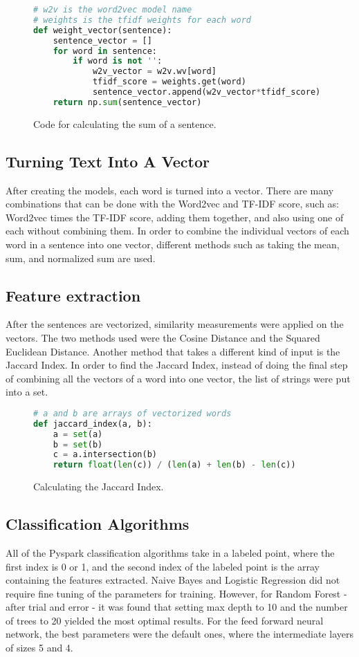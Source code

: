 \documentclass[9pt,twocolumn,twoside]{idsi}
\begin{document}
\begin{figure}[h!]
\begin{lstlisting}[language=python]
# w2v is the word2vec model name
# weights is the tfidf weights for each word
def weight_vector(sentence):
    sentence_vector = []
    for word in sentence:
        if word is not '':
            w2v_vector = w2v.wv[word]
            tfidf_score = weights.get(word)
            sentence_vector.append(w2v_vector*tfidf_score)
    return np.sum(sentence_vector)
\end{lstlisting}
\caption{Code for calculating the sum of a sentence.}
\end{figure}

\subsection{Turning Text Into A Vector}
After creating the models, each word is turned into a vector. There are many combinations that can be done with the Word2vec and TF-IDF score, such as: Word2vec times the TF-IDF score, adding them together, and also using one of each without combining them. In order to combine the individual vectors of each word in a sentence into one vector, different methods such as taking the mean, sum, and normalized sum are used.

\subsection{Feature extraction}
After the sentences are vectorized, similarity measurements were applied on the vectors.
The two methods used were the Cosine Distance and the Squared Euclidean Distance. Another method that takes a different kind of input is the Jaccard Index. 
In order to find the Jaccard Index, instead of doing the final step of combining all the vectors of a word into one vector, the list of strings were put into a set.

\begin{figure}[h!]
\begin{lstlisting}[language=python]
# a and b are arrays of vectorized words
def jaccard_index(a, b):
    a = set(a)
    b = set(b)
    c = a.intersection(b)
    return float(len(c)) / (len(a) + len(b) - len(c))
\end{lstlisting}
\caption{Calculating the Jaccard Index.}
\end{figure}

\subsection{Classification Algorithms}
All of the Pyspark classification algorithms take in a labeled point, where the first index is 0 or 1, and the second index of the labeled point is the array containing the features extracted. Naive Bayes and Logistic Regression did not require fine tuning of the parameters for training. However, for Random Forest - after trial and error - it was found that setting max depth to 10 and the number of trees to 20 yielded the most optimal results. For the feed forward neural network, the best parameters were the default ones, where the intermediate layers of sizes 5 and 4.
\raggedbottom
\end{document}
